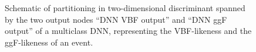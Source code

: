 \begin{figure}[t]
    \caption[Schematic of partitioning in two-dimensional discriminant spanned by the two output nodes ``DNN VBF output'' and ``DNN ggF output'' of a multiclass DNN.]{Schematic of partitioning in two-dimensional discriminant spanned by the two output nodes ``DNN VBF output'' and ``DNN ggF output'' of a multiclass DNN, representing the VBF-likeness and the ggF-likeness of an event.}
    \label{app:fig:hwwejet-schematic-partitioning}
\end{figure}









